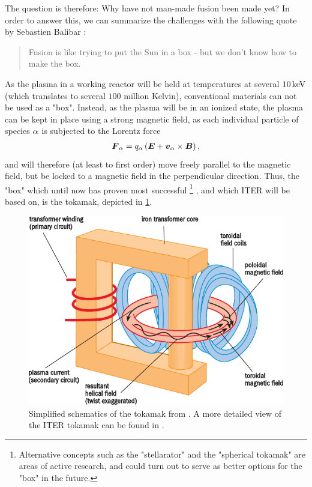 The question is therefore: Why have not man-made fusion been made yet?
In order to answer this, we can summarize the challenges with the following quote by Sebastien Balibar \cite{Balibar2009Web}:
%
\begin{quote}
    Fusion is like trying to put the Sun in a box - but we don't know how to make the box.
\end{quote}
%
As the plasma in a working reactor will be held at temperatures at several $10 \, \text{keV}$ (which translates to several $100$ million Kelvin), conventional materials can not be used as a "box".
Instead, as the plasma will be in an ionized state, the plasma can be kept in place using a strong magnetic field, as each individual particle of species $\alpha$ is subjected to the Lorentz force
%
\begin{align*}
    \boldsymbol{F}_\alpha = q_\alpha \left(\boldsymbol{E} + \boldsymbol{v}_\alpha\times\boldsymbol{B}\right),
\end{align*}
%
and will therefore (at least to first order) move freely parallel to the magnetic field, but be locked to a magnetic field in the perpendicular direction.
Thus, the "box" which until now has proven most successful%
%
\footnote{Alternative concepts such as the "stellarator" and the "spherical tokamak" are areas of active research, and could turn out to serve as better options for the "box" in the future.}
%
, and which ITER will be based on, is the tokamak, depicted in \cref{fig:tokamak}.
%
\begin{figure}[htb]
    \begin{center}
        \includegraphics{fig/intro/tokamak}
    \end{center}
    \caption{Simplified schematics of the tokamak from \cite{nuttall2008}.
        A more detailed view of the ITER tokamak can be found in \cite{ITERWeb}.}
    \label{fig:tokamak}
\end{figure}

